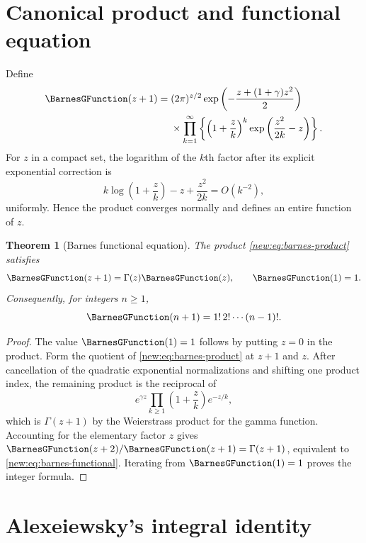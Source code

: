 \documentclass[11pt,a4paper,oneside,openany]{book}
\newtheorem{theorem}{Theorem}[chapter]
\theoremstyle{definition}
\theoremstyle{remark}
\begin{document}
\section{Canonical product and functional equation}

Define
\begin{equation}
 \begin{split}
 \BarnesGFunction(z+1)={}&(2\pi)^{z/2}
 \exp\left(-\frac{z+(1+\gamma)z^2}{2}\right)\\
 &\times\prod_{k=1}^{\infty}
 \left\{\left(1+\frac zk\right)^k
 \exp\left(\frac{z^2}{2k}-z\right)\right\}.
 \end{split}
 \label{new:eq:barnes-product}
\end{equation}
For $z$ in a compact set, the logarithm of the $k$th factor after its explicit
exponential correction is
\[
 k\log\left(1+\frac zk\right)-z+\frac{z^2}{2k}
 =O(k^{-2}),
\]
uniformly.  Hence the product converges normally and defines an entire
function of $z$.

\begin{theorem}[Barnes functional equation]
The product \eqref{new:eq:barnes-product} satisfies
\begin{equation}
 \BarnesGFunction(z+1)=\Gamma(z)\BarnesGFunction(z),\qquad \BarnesGFunction(1)=1.
 \label{new:eq:barnes-functional}
\end{equation}
Consequently, for integers $n\ge1$,
\begin{equation}
 \BarnesGFunction(n+1)=1!\,2!\cdots(n-1)!.
 \label{new:eq:barnes-integers}
\end{equation}
\end{theorem}

\begin{proof}
The value $\BarnesGFunction(1)=1$ follows by putting $z=0$ in the product.  Form the quotient
of \eqref{new:eq:barnes-product} at $z+1$ and $z$.  After cancellation of the
quadratic exponential normalizations and shifting one product index, the
remaining product is the reciprocal of
\[
 e^{\gamma z}\prod_{k\ge1}
 \left(1+\frac zk\right)e^{-z/k},
\]
which is $\Gamma(z+1)$ by the Weierstrass product for the gamma function.
Accounting for the elementary factor $z$ gives
$\BarnesGFunction(z+2)/\BarnesGFunction(z+1)=\Gamma(z+1)$, equivalent to
\eqref{new:eq:barnes-functional}.  Iterating from $\BarnesGFunction(1)=1$ proves the integer
formula.
\end{proof}

\section{Alexeiewsky's integral identity}
\end{document}
